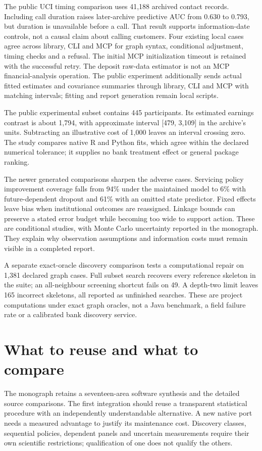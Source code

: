 The public UCI timing comparison uses 41,188 archived contact records.
Including call duration raises later-archive predictive AUC from 0.630 to
0.793, but duration is unavailable before a call. That result supports
information-date controls, not a causal claim about calling customers.
Four existing local cases agree across library, CLI and MCP for graph
syntax, conditional adjustment, timing checks and a refusal. The initial
MCP initialization timeout is retained with the successful retry. The
deposit raw-data estimator is not an MCP financial-analysis operation. The
public experiment additionally sends actual fitted estimates and covariance
summaries through library, CLI and MCP with matching intervals; fitting and
report generation remain local scripts.

The public experimental subset contains 445 participants. Its estimated
earnings contrast is about 1,794, with approximate interval [479, 3,109] in
the archive's units. Subtracting an illustrative cost of 1,000 leaves an
interval crossing zero. The study compares native R and Python fits, which
agree within the declared numerical tolerance; it supplies no bank treatment
effect or general package ranking.

The newer generated comparisons sharpen the adverse cases. Servicing policy
improvement coverage falls from 94\% under the maintained model to 6\% with
future-dependent dropout and 61\% with an omitted state predictor. Fixed
effects leave bias when institutional outcomes are reassigned. Linkage bounds
can preserve a stated error budget while becoming too wide to support action.
These are conditional studies, with Monte Carlo uncertainty reported in the
monograph. They explain why observation assumptions and information costs
must remain visible in a completed report.

A separate exact-oracle discovery comparison tests a computational repair on
1,381 declared graph cases. Full subset search recovers every reference
skeleton in the suite; an all-neighbour screening shortcut fails on 49.
A depth-two limit leaves 165 incorrect skeletons, all reported as unfinished
searches. These are project computations under exact graph oracles, not a
Java benchmark, a field failure rate or a calibrated bank discovery service.

\section*{What to reuse and what to compare}
The monograph retains a seventeen-area software synthesis and the detailed
source comparisons. The first integration should reuse a transparent
statistical procedure with an independently understandable alternative.
A new native port needs a measured advantage to justify its maintenance
cost. Discovery classes, sequential policies, dependent panels and uncertain
measurements require their own scientific restrictions; qualification of
one does not qualify the others.


